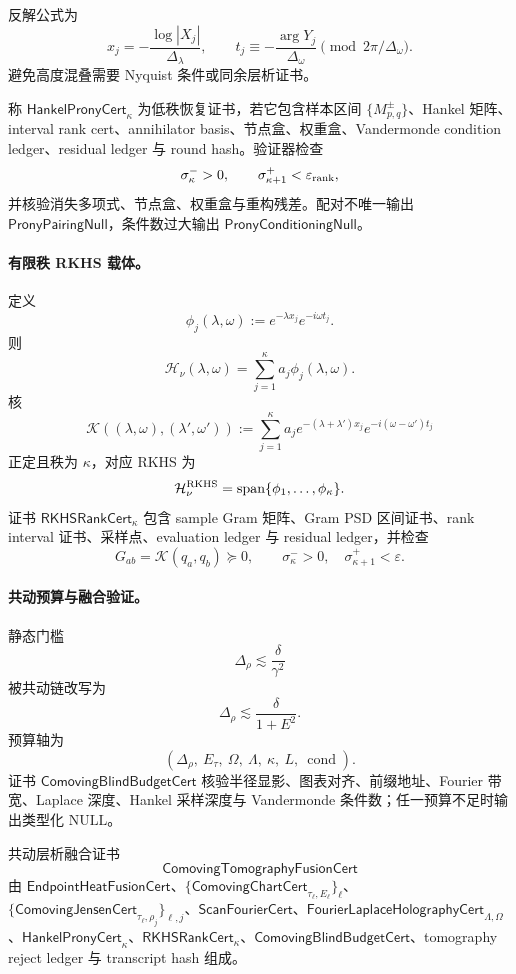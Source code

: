 反解公式为
\[
x_j=-\frac{\log|X_j|}{\Delta_\lambda},
\qquad
t_j\equiv-\frac{\arg Y_j}{\Delta_\omega}
\pmod{2\pi/\Delta_\omega}.
\]
避免高度混叠需要 Nyquist 条件或同余层析证书。

\begin{definition}\label{def:typed-address-biaxial-completion-hankel-prony-cert}
称 \(\mathsf{HankelPronyCert}_{\kappa}\) 为低秩恢复证书，若它包含样本区间 \(\{M_{p,q}^{\pm}\}\)、Hankel 矩阵、interval rank cert、annihilator basis、节点盒、权重盒、Vandermonde condition ledger、residual ledger 与 round hash。验证器检查
\[
\sigma_\kappa^->0,\qquad \sigma_{\kappa+1}^+<\varepsilon_{\rm rank},
\]
并核验消失多项式、节点盒、权重盒与重构残差。配对不唯一输出 \(\mathsf{PronyPairingNull}\)，条件数过大输出 \(\mathsf{PronyConditioningNull}\)。
\end{definition}

\paragraph{有限秩 RKHS 载体。}
定义
\[
\phi_j(\lambda,\omega):=e^{-\lambda x_j}e^{-i\omega t_j}.
\]
则
\[
\mathcal H_\nu(\lambda,\omega)
=
\sum_{j=1}^{\kappa}a_j\phi_j(\lambda,\omega).
\]
核
\[
\mathcal K((\lambda,\omega),(\lambda',\omega'))
:=
\sum_{j=1}^{\kappa}
a_j e^{-(\lambda+\lambda')x_j}e^{-i(\omega-\omega')t_j}
\]
正定且秩为 \(\kappa\)，对应 RKHS 为
\[
\mathcal H_\nu^{\rm RKHS}
=
\operatorname{span}\{\phi_1,\ldots,\phi_\kappa\}.
\]
证书 \(\mathsf{RKHSRankCert}_{\kappa}\) 包含 sample Gram 矩阵、Gram PSD 区间证书、rank interval 证书、采样点、evaluation ledger 与 residual ledger，并检查
\[
G_{ab}=\mathcal K(q_a,q_b)\succeq0,\qquad
\sigma_\kappa^->0,\quad
\sigma_{\kappa+1}^+<\varepsilon.
\]

\paragraph{共动预算与融合验证。}
静态门槛
\[
\Delta_\rho\lesssim\frac{\delta}{\gamma^2}
\]
被共动链改写为
\[
\boxed{
\Delta_\rho\lesssim\frac{\delta}{1+E^2}.
}
\]
预算轴为
\[
(\Delta_\rho,\ E_\tau,\ \Omega,\ \Lambda,\ \kappa,\ L,\ \operatorname{cond}).
\]
证书 \(\mathsf{ComovingBlindBudgetCert}\) 核验半径显影、图表对齐、前缀地址、Fourier 带宽、Laplace 深度、Hankel 采样深度与 Vandermonde 条件数；任一预算不足时输出类型化 \(\mathrm{NULL}\)。

\begin{definition}[共动层析融合证书]\label{def:typed-address-biaxial-completion-comoving-tomography-fusion-cert}
共动层析融合证书
\[
\mathsf{ComovingTomographyFusionCert}
\]
由 \(\mathsf{EndpointHeatFusionCert}\)、\(\{\mathsf{ComovingChartCert}_{\tau_\ell,E_\ell}\}_\ell\)、\(\{\mathsf{ComovingJensenCert}_{\tau_\ell,\rho_j}\}_{\ell,j}\)、\(\mathsf{ScanFourierCert}\)、\(\mathsf{FourierLaplaceHolographyCert}_{\Lambda,\Omega}\)、\(\mathsf{HankelPronyCert}_{\kappa}\)、\(\mathsf{RKHSRankCert}_{\kappa}\)、\(\mathsf{ComovingBlindBudgetCert}\)、tomography reject ledger 与 transcript hash 组成。
\end{definition}

